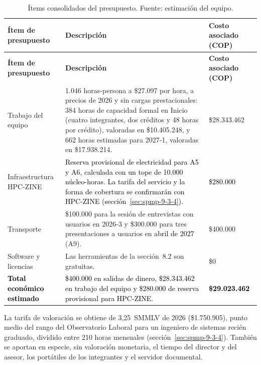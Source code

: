 \begin{longtable}{|>{\raggedright\arraybackslash}p{0.21\dimexpr\linewidth-6\tabcolsep-4\arrayrulewidth\relax}|>{\raggedright\arraybackslash}p{0.55\dimexpr\linewidth-6\tabcolsep-4\arrayrulewidth\relax}|>{\raggedright\arraybackslash}p{0.24\dimexpr\linewidth-6\tabcolsep-4\arrayrulewidth\relax}|}
\caption{Ítems consolidados del presupuesto. Fuente: estimación del equipo.}\label{tab:presupuesto}\\
\hline
\textbf{Ítem de presupuesto} & \textbf{Descripción} & \textbf{Costo asociado (COP)}\tabularnewline\hline
\endfirsthead
\hline
\textbf{Ítem de presupuesto} & \textbf{Descripción} & \textbf{Costo asociado (COP)}\tabularnewline\hline
\endhead
\raggedright Trabajo del equipo & \raggedright 1.046 horas-persona a \$27.097 por hora, a precios de 2026 y sin cargas prestacionales: 384 horas de capacidad formal en Inicio (cuatro integrantes, dos créditos y 48 horas por crédito), valoradas en \$10.405.248, y 662 horas estimadas para 2027-1, valoradas en \$17.938.214. & \raggedright \$28.343.462\tabularnewline\hline
\raggedright Infraestructura HPC-ZINE & \raggedright \textcolor{black}{Reserva provisional de electricidad para A5 y A6, calculada con un tope de 10.000 núcleo-horas. La tarifa del servicio y la forma de cobertura se confirmarán con HPC-ZINE (sección~\ref{sec:spmp-9-3-4}).} & \raggedright \textcolor{black}{\$280.000}\tabularnewline\hline
\raggedright Transporte & \raggedright \$100.000 para la sesión de entrevistas con usuarios en 2026-3 y \$300.000 para tres presentaciones a usuarios en \textcolor{black}{abril de 2027} (A9). & \raggedright \$400.000\tabularnewline\hline
\raggedright Software y licencias & \raggedright Las herramientas de la sección~8.2 son gratuitas. & \raggedright \$0\tabularnewline\hline
\raggedright \textbf{\textcolor{black}{Total económico estimado}} & \raggedright \textcolor{black}{\$400.000 en salidas de dinero, \$28.343.462 en trabajo del equipo y \$280.000 de reserva provisional para HPC-ZINE.} & \raggedright \textbf{\textcolor{black}{\$29.023.462}}\tabularnewline\hline
\end{longtable}

La tarifa de valoración se obtiene de 3,25~SMMLV de 2026 (\$1.750.905), punto medio del rango del Observatorio Laboral para un ingeniero de sistemas recién graduado, dividido entre 210 horas mensuales (sección~\ref{sec:spmp-9-3-4}). También se aportan en especie, sin valoración monetaria, el tiempo del director y del asesor, los portátiles de los integrantes y el servidor documental.
